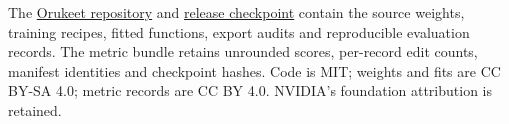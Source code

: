 \documentclass{article}
\begin{document}
The \href{https://github.com/Oruk-AI/orukeet}{Orukeet repository} and
\href{https://huggingface.co/oruk/orukeet/resolve/555136b50265a132d4cea0d35560c26fc4f657ab/orukeet-v0.1.0.nemo}{release checkpoint}
contain the source weights, training recipes, fitted functions, export audits
and reproducible evaluation records. The metric bundle retains unrounded
scores, per-record edit counts, manifest identities and checkpoint hashes.
Code is MIT; weights and fits are CC BY-SA 4.0; metric records are CC BY 4.0.
NVIDIA's foundation attribution is retained.

\par\begin{minipage}{\linewidth}
\small


\end{minipage}

\end{document}
